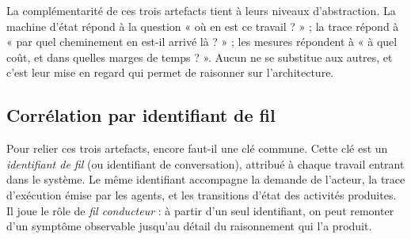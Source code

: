 La complémentarité de ces trois artefacts tient à leurs niveaux
d'abstraction. La machine d'état répond à la question « où en est ce
travail ? » ; la trace répond à « par quel cheminement en est-il
arrivé là ? » ; les mesures répondent à « à quel coût, et dans quelles
marges de temps ? ». Aucun ne se substitue aux autres, et c'est leur
mise en regard qui permet de raisonner sur l'architecture.

\subsection{Corrélation par identifiant de fil}
\label{sec:correlation}

Pour relier ces trois artefacts, encore faut-il une clé commune. Cette
clé est un \emph{identifiant de fil} (ou identifiant de conversation),
attribué à chaque travail entrant dans le système. Le même
identifiant accompagne la demande de l'acteur, la trace d'exécution
émise par les agents, et les transitions d'état des activités
produites. Il joue le rôle de \emph{fil conducteur} : à partir d'un
seul identifiant, on peut remonter d'un symptôme observable jusqu'au
détail du raisonnement qui l'a produit.

